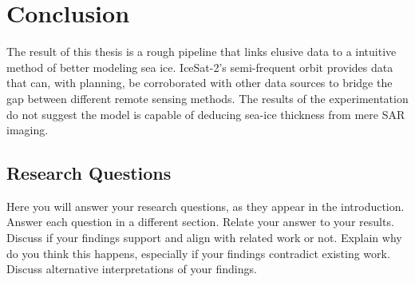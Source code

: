 \chapter{Conclusion}
\label{sec:Conclusion}

The result of this thesis is a rough pipeline that links elusive data to a intuitive method of better modeling sea ice. IceSat-2's semi-frequent orbit provides data that can, with planning, be corroborated with other data sources to bridge the gap between different remote sensing methods. The results of the experimentation do not suggest the model is capable of deducing sea-ice thickness from mere SAR imaging.


\section{Research Questions}
Here you will answer your research questions, as they appear in the introduction. Answer each question in a different section. Relate your answer to your results.
Discuss if your findings support and align with related work or not. Explain why do you think this happens, especially if your findings contradict existing work.
Discuss alternative interpretations of your findings.
